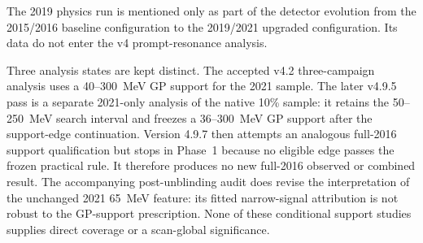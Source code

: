 The 2019 physics run is mentioned only as part of the detector evolution from the
2015/2016 baseline configuration to the 2019/2021 upgraded configuration. Its data do
not enter the v4 prompt-resonance analysis.

Three analysis states are kept distinct.  The accepted v4.2 three-campaign analysis
uses a 40--300~MeV GP support for the 2021 sample.  The later v4.9.5 pass is a separate
2021-only analysis of the native 10\% sample: it retains the 50--250~MeV search interval
and freezes a 36--300~MeV GP support after the support-edge continuation.  Version
4.9.7 then attempts an analogous full-2016 support qualification but stops in Phase~1
because no eligible edge passes the frozen practical rule.  It therefore produces no
new full-2016 observed or combined result.  The accompanying post-unblinding audit
does revise the interpretation of the unchanged 2021 65~MeV feature: its fitted
narrow-signal attribution is not robust to the GP-support prescription.  None of these
conditional support studies supplies direct coverage or a scan-global significance.
